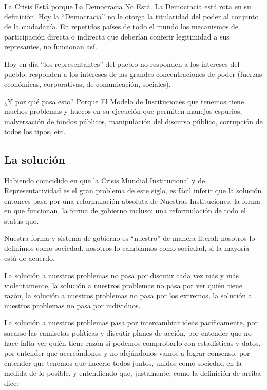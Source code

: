\documentclass[
]{book}
\begin{document}
La Crisis Está porque La Democracia No Está. La Democracia está rota en su definición. Hoy la ``Democracia'' no le otorga la titularidad del poder al conjunto de la ciudadanía. En repetidos países de todo el mundo los mecanismos de participación directa o indirecta que deberían conferir legitimidad a sus represantes, no funcionan así.

Hoy en día ``los representantes'' del pueblo no responden a los intereses del pueblo; responden a los intereses de las grandes concentraciones de poder (fuerzas económicas, corporativas, de comunicación, sociales).

¿Y por qué pasa esto? Porque El Modelo de Instituciones que tenemos tiene muchos problemas y huecos en su ejecución que permiten manejos espurios, malversación de fondos públicos, manipulación del discurso público, corrupción de todos los tipos, etc.

\hypertarget{la-soluciuxf3n}{%
\subsection{La solución}\label{la-soluciuxf3n}}

Habiendo coincidido en que la Crisis Mundial Institucional y de Representatividad es el gran problema de este siglo, es fácil inferir que la solución entonces pasa por una reformulación absoluta de Nuestras Instituciones, la forma en que funcionan, la forma de gobierno incluso: una reformulación de todo el status quo.

Nuestra forma y sistema de gobierno es ``nuestro'' de manera literal: nosotros lo definimos como sociedad, nosotros lo cambiamos como sociedad, si la mayoría está de acuerdo.

La solución a nuestros problemas no pasa por discutir cada vez más y más violentamente, la solución a nuestros problemas no pasa por ver quién tiene razón, la solución a nuestros problemas no pasa por los extremos, la solución a nuestros problemas no pasa por individuos.

La solución a nuestros problemas pasa por intercambiar ideas pacíficamente, por sacarse las camisetas políticas y discutir planes de acción, por entender que no hace falta ver quién tiene razón si podemos comprobarlo con estadísticas y datos, por entender que acercándonos y no alejándonos vamos a lograr consenso, por entender que tenemos que hacerlo todos juntos, unidos como sociedad en la medida de lo posible, y entendiendo que, justamente, como la definición de arriba dice:
\end{document}
